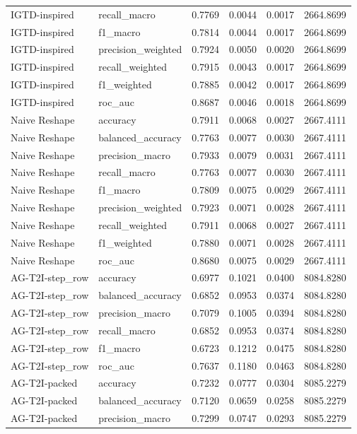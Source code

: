 \begin{tabular}{llrrrr}
IGTD-inspired & recall_macro & 0.7769 & 0.0044 & 0.0017 & 2664.8699 \\
IGTD-inspired & f1_macro & 0.7814 & 0.0044 & 0.0017 & 2664.8699 \\
IGTD-inspired & precision_weighted & 0.7924 & 0.0050 & 0.0020 & 2664.8699 \\
IGTD-inspired & recall_weighted & 0.7915 & 0.0043 & 0.0017 & 2664.8699 \\
IGTD-inspired & f1_weighted & 0.7885 & 0.0042 & 0.0017 & 2664.8699 \\
IGTD-inspired & roc_auc & 0.8687 & 0.0046 & 0.0018 & 2664.8699 \\
Naive Reshape & accuracy & 0.7911 & 0.0068 & 0.0027 & 2667.4111 \\
Naive Reshape & balanced_accuracy & 0.7763 & 0.0077 & 0.0030 & 2667.4111 \\
Naive Reshape & precision_macro & 0.7933 & 0.0079 & 0.0031 & 2667.4111 \\
Naive Reshape & recall_macro & 0.7763 & 0.0077 & 0.0030 & 2667.4111 \\
Naive Reshape & f1_macro & 0.7809 & 0.0075 & 0.0029 & 2667.4111 \\
Naive Reshape & precision_weighted & 0.7923 & 0.0071 & 0.0028 & 2667.4111 \\
Naive Reshape & recall_weighted & 0.7911 & 0.0068 & 0.0027 & 2667.4111 \\
Naive Reshape & f1_weighted & 0.7880 & 0.0071 & 0.0028 & 2667.4111 \\
Naive Reshape & roc_auc & 0.8680 & 0.0075 & 0.0029 & 2667.4111 \\
AG-T2I-step_row & accuracy & 0.6977 & 0.1021 & 0.0400 & 8084.8280 \\
AG-T2I-step_row & balanced_accuracy & 0.6852 & 0.0953 & 0.0374 & 8084.8280 \\
AG-T2I-step_row & precision_macro & 0.7079 & 0.1005 & 0.0394 & 8084.8280 \\
AG-T2I-step_row & recall_macro & 0.6852 & 0.0953 & 0.0374 & 8084.8280 \\
AG-T2I-step_row & f1_macro & 0.6723 & 0.1212 & 0.0475 & 8084.8280 \\
AG-T2I-step_row & roc_auc & 0.7637 & 0.1180 & 0.0463 & 8084.8280 \\
AG-T2I-packed & accuracy & 0.7232 & 0.0777 & 0.0304 & 8085.2279 \\
AG-T2I-packed & balanced_accuracy & 0.7120 & 0.0659 & 0.0258 & 8085.2279 \\
AG-T2I-packed & precision_macro & 0.7299 & 0.0747 & 0.0293 & 8085.2279 \\

\end{tabular}
